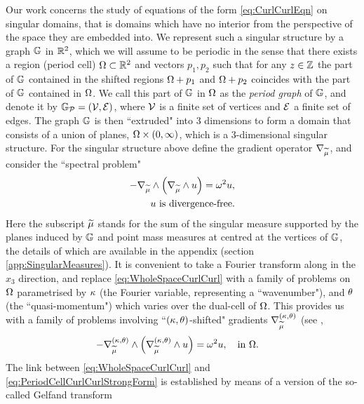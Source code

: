 Our work concerns the study of equations of the form \eqref{eq:CurlCurlEqn} on singular domains, that is domains which have no interior from the perspective of the space they are embedded into.
We represent such a singular structure by a graph $\mathbb{G}$ in $\mathbb{R}^2$, which we will assume to be periodic in the sense that there exists a region (period cell) $\Omega\subset\mathbb{R}^2$ and vectors $p_1, p_2$ such that for any $z\in\mathbb{Z}$ the part of $\mathbb{G}$ contained in the shifted regions $\Omega+p_1$ and $\Omega+p_2$ coincides with the part of $\mathbb{G}$ contained in $\Omega$.
We call this part of $\mathbb{G}$ in $\Omega$ as the \emph{period graph} of $\mathbb{G}$, and denote it by $\mathbb{G}_{\mathcal{P}}=\left( \mathcal{V}, \mathcal{E} \right)$, where $\mathcal{V}$ is a finite set of vertices and $\mathcal{E}$ a finite set of edges.
The graph $\mathbb{G}$ is then ``extruded" into 3 dimensions to form a domain that consists of a union of planes, $\Omega\times\left( 0,\infty \right)$, which is a 3-dimensional singular structure.
For the singular structure above define the gradient operator $\nabla_{\widetilde{\mu}}$, and consider the ``spectral problem"
\begin{subequations} \label{eq:WholeSpaceCurlCurl}
	\begin{align} 
		-\nabla_{\widetilde{\mu}}\wedge \left(  \nabla_{\widetilde{\mu}}\wedge u  \right) = \omega^2 u &, \\
		u \text{ is divergence-free} &.
	\end{align}
\end{subequations}
Here the subscript $\widetilde{\mu}$ stands for the sum of the singular measure supported by the planes induced by $\mathbb{G}$ and point mass measures at centred at the vertices of $\mathbb{G}$, the details of which are available in the appendix (section \ref{app:SingularMeasures}).
It is convenient to take a Fourier transform along in the $x_3$ direction, and replace \eqref{eq:WholeSpaceCurlCurl} with a family of problems on $\Omega$ parametrised by $\kappa$ (the Fourier variable, representing a ``wavenumber"), and $\theta$ (the ``quasi-momentum") which varies over the dual-cell of $\Omega$.
This provides us with a family of problems involving ``$\left( \kappa, \theta \right)$-shifted" gradients $\nabla^{\left( \kappa, \theta \right)}_{\widetilde{\mu}}$ (see ,
\begin{align} \label{eq:PeriodCellCurlCurlStrongForm}
	- \nabla_{\widetilde{\mu}}^{\left( \kappa, \theta \right)}\wedge \left(  \nabla_{\widetilde{\mu}}^{\left( \kappa, \theta \right)}\wedge u  \right) &= \omega^2 u, \quad\text{in } \Omega.
\end{align}
The link between \eqref{eq:WholeSpaceCurlCurl} and \eqref{eq:PeriodCellCurlCurlStrongForm} is established by means of a version of the so-called Gelfand transform \cite{gelfand1950expansion}
